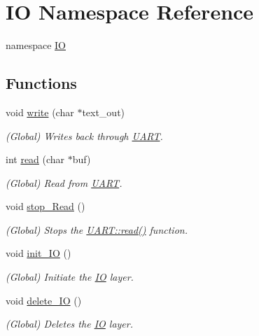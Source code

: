 \hypertarget{namespace_i_o}{}\section{IO Namespace Reference}
\label{namespace_i_o}


namespace \mbox{\hyperlink{namespace_i_o}{IO}}  


\subsection*{Functions}
\begin{DoxyCompactItemize}
\item 
void \mbox{\hyperlink{namespace_i_o_a20b32a5769a95ed363726431c01702e9}{write}} (char $\ast$text\+\_\+out)
\begin{DoxyCompactList}\small\item\em (Global) Writes back through \mbox{\hyperlink{namespace_u_a_r_t}{U\+A\+RT}}. \end{DoxyCompactList}\item 
int \mbox{\hyperlink{namespace_i_o_a1087fba97ca797e5ca155228ff9eec55}{read}} (char $\ast$buf)
\begin{DoxyCompactList}\small\item\em (Global) Read from \mbox{\hyperlink{namespace_u_a_r_t}{U\+A\+RT}}. \end{DoxyCompactList}\item 
void \mbox{\hyperlink{namespace_i_o_a04c5db8c053f07761c5c09894a4bd49d}{stop\+\_\+\+Read}} ()
\begin{DoxyCompactList}\small\item\em (Global) Stops the \mbox{\hyperlink{namespace_u_a_r_t_a1087fba97ca797e5ca155228ff9eec55}{U\+A\+R\+T\+::read()}} function. \end{DoxyCompactList}\item 
void \mbox{\hyperlink{namespace_i_o_a83055f0dd9e551c9e898a69d48530663}{init\+\_\+\+IO}} ()
\begin{DoxyCompactList}\small\item\em (Global) Initiate the \mbox{\hyperlink{namespace_i_o}{IO}} layer. \end{DoxyCompactList}\item 
void \mbox{\hyperlink{namespace_i_o_a71df3822c66f8b597b92e7e906a9d61f}{delete\+\_\+\+IO}} ()
\begin{DoxyCompactList}\small\item\em (Global) Deletes the \mbox{\hyperlink{namespace_i_o}{IO}} layer. \end{DoxyCompactList}\end{DoxyCompactItemize}


